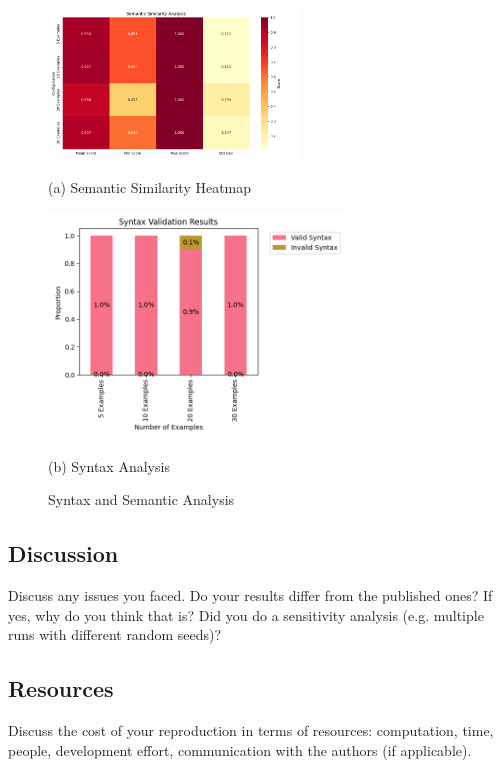 \documentclass[11pt,a4paper]{article}
\begin{document}
\begin{figure}[!t]
    \centering
    \begin{minipage}{0.95\columnwidth}
        \includegraphics[width=\linewidth,height=4cm,keepaspectratio]{Graphs/semantic_similarity_heatmap.png}
        \vspace{-0.2cm}
        \caption*{(a) Semantic Similarity Heatmap}
    \end{minipage}
    \vspace{0.1cm}
    
    \begin{minipage}{0.95\columnwidth}
        \includegraphics[width=\linewidth,height=6cm,keepaspectratio]{Graphs/syntax_analysis.png}
        \vspace{-0.2cm}
        \caption*{(b) Syntax Analysis}
    \end{minipage}
    \vspace{-0.2cm}
    \caption{Syntax and Semantic Analysis}
    \label{fig:syntax-and-semantic-analysis}
\end{figure}

\subsection{Discussion}
Discuss any issues you faced. Do your results differ from the published ones? If yes, why do you think that is? Did you do a sensitivity analysis (e.g. multiple runs with different random seeds)?

\subsection{Resources}
Discuss the cost of your reproduction in terms of resources: computation, time, people, development effort, communication with the authors (if applicable).
\end{document}
